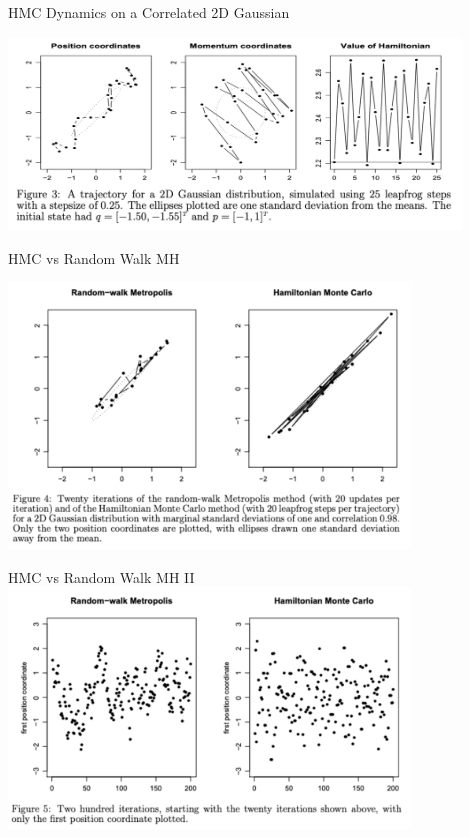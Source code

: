\documentclass[aspectratio=169]{beamer}
\begin{document}
\begin{frame}{HMC Dynamics on a Correlated 2D Gaussian}

\centering
\includegraphics[width=0.9\textwidth]{figures/lap3/hmc_2d.pdf}
    
\end{frame}

\begin{frame}{HMC vs Random Walk MH}

\centering
\includegraphics[width=0.8\textwidth]{figures/lap3/hmc_2d_comparison.pdf}
    
\end{frame}


\begin{frame}{HMC vs Random Walk MH II}
\centering
\includegraphics[width=0.8\textwidth]{figures/lap3/hmc_2d_traces.pdf}
\end{frame}
\end{document}
